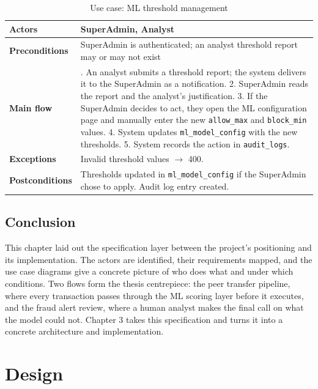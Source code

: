 \documentclass[12pt,a4paper]{report}
\begin{document}
\begin{table}[H]
\centering
\renewcommand{\arraystretch}{1.25}
\begin{tabularx}{\linewidth}{|>{\bfseries}p{2.8cm}|>{\raggedright\arraybackslash}X|}
\hline
Actors & SuperAdmin, Analyst \\
\hline
Preconditions & SuperAdmin is authenticated; an analyst threshold report may or may not exist \\
\hline
Main flow & 1. An analyst submits a threshold report; the system delivers it to the SuperAdmin as a notification. 2. SuperAdmin reads the report and the analyst's justification. 3. If the SuperAdmin decides to act, they open the ML configuration page and manually enter the new \texttt{allow\_max} and \texttt{block\_min} values. 4. System updates \texttt{ml\_model\_config} with the new thresholds. 5. System records the action in \texttt{audit\_logs}. \\
\hline
Exceptions & Invalid threshold values $\rightarrow$ 400. \\
\hline
Postconditions & Thresholds updated in \texttt{ml\_model\_config} if the SuperAdmin chose to apply. Audit log entry created. \\
\hline
\end{tabularx}
\caption{Use case: ML threshold management}
\label{tab:uc-ml-threshold}
\end{table}

\section{Conclusion}

This chapter laid out the specification layer between the project's positioning and its
implementation. The actors are identified, their requirements mapped, and the use case
diagrams give a concrete picture of who does what and under which conditions. Two flows
form the thesis centrepiece: the peer transfer pipeline, where every transaction
passes through the ML scoring layer before it executes, and the fraud alert review, where a
human analyst makes the final call on what the model could not. Chapter 3 takes this
specification and turns it into a concrete architecture and implementation.

\chapter{Design}
\label{chap:design}
\end{document}
